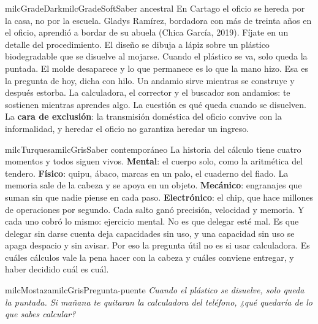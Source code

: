 \documentclass[11pt,letterpaper]{article}
\begin{document}
\begin{softbox}{milcGradeDark}{milcGradeSoft}{Saber ancestral}
En Cartago el oficio se hereda por la casa, no por la escuela. Gladys Ramírez, bordadora con más de treinta años en el oficio, aprendió a bordar de su abuela (Chica García, 2019). Fíjate en un detalle del procedimiento. El diseño se dibuja a lápiz sobre un plástico biodegradable que se disuelve al mojarse. Cuando el plástico se va, solo queda la puntada. El molde desaparece y lo que permanece es lo que la mano hizo. Esa es la pregunta de hoy, dicha con hilo. Un andamio sirve mientras se construye y después estorba. La calculadora, el corrector y el buscador son andamios: te sostienen mientras aprendes algo. La cuestión es qué queda cuando se disuelven. La \textbf{cara de exclusión}: la transmisión doméstica del oficio convive con la informalidad, y heredar el oficio no garantiza heredar un ingreso.\par{}
\end{softbox}

\begin{softbox}{milcTurquesa}{milcGris}{Saber contemporáneo}
La historia del cálculo tiene cuatro momentos y todos siguen vivos. \textbf{Mental}: el cuerpo solo, como la aritmética del tendero. \textbf{Físico}: quipu, ábaco, marcas en un palo, el cuaderno del fiado. La memoria sale de la cabeza y se apoya en un objeto. \textbf{Mecánico}: engranajes que suman sin que nadie piense en cada paso. \textbf{Electrónico}: el chip, que hace millones de operaciones por segundo. Cada salto ganó precisión, velocidad y memoria. Y cada uno cobró lo mismo: ejercicio mental. No es que delegar esté mal. Es que delegar sin darse cuenta deja capacidades sin uso, y una capacidad sin uso se apaga despacio y sin avisar. Por eso la pregunta útil no es si usar calculadora. Es cuáles cálculos vale la pena hacer con la cabeza y cuáles conviene entregar, y haber decidido cuál es cuál.
\end{softbox}

\begin{softbox}{milcMostaza}{milcGris}{Pregunta-puente}
\textit{Cuando el plástico se disuelve, solo queda la puntada. Si mañana te quitaran la calculadora del teléfono, ¿qué quedaría de lo que sabes calcular?}
\end{softbox}
\end{document}
